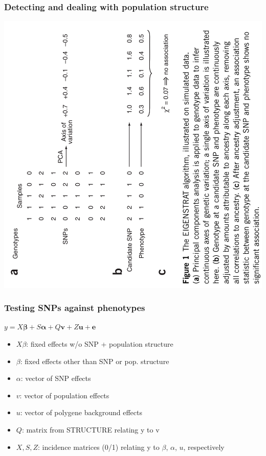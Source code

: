 \begin{frame}
\frametitle{Detecting and dealing with population structure}
\begin{block}{}
\centering
\includegraphics[height=0.8\textheight]{price_rot.png}\\
\tiny
\citet[Figure 1]{Price:2006cd}
\end{block}
\end{frame}

\begin{frame}
\frametitle{Testing SNPs against phenotypes}
\begin{block}{}
\begin{center}
\Large{$y=X \bm{\beta} + S \bm{\alpha} + Q \bm{v} + Z \bm{u} + \bm{e}$}
\end{center}
\begin{itemize}
\item{$X \beta$: fixed effects w/o SNP + population structure}
\item{$\beta$: fixed effects other than SNP or pop. structure}
\item{$\alpha$: vector of SNP effects}
\item{$v$: vector of population effects}
\item{$u$: vector of polygene background effects}
\item{$Q$: matrix from STRUCTURE relating y to v}
\item{$X, S, Z$: incidence matrices (0/1) relating y to $\beta$, $\alpha$, $u$,
respectively}
\end{itemize}
\end{block}
\tiny
\citet{Yu:2006ij}
\end{frame}

